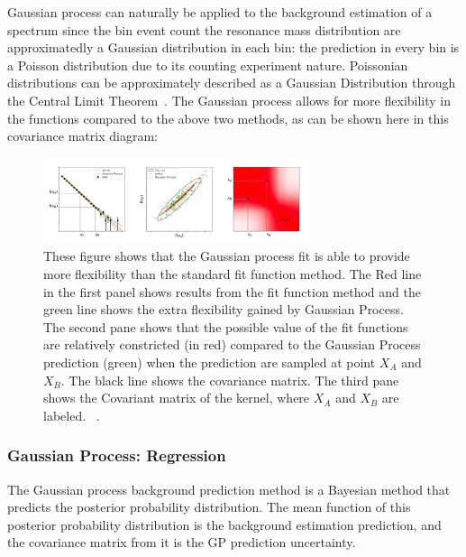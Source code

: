     Gaussian process can naturally be applied to the background estimation of a spectrum since the bin event count the resonance mass distribution are approximatedly a Gaussian distribution in each bin: the prediction in every bin is a Poisson distribution due to its counting experiment nature. Poissonian distributions can be approximately described as a Gaussian Distribution through the Central Limit Theorem~\cite{kwak2017central}. The Gaussian process allows for more flexibility in the functions compared to the above two methods, as can be shown here in this covariance matrix diagram:

    \begin{figure}[!htb]
        \begin{center}
            \includegraphics[width=0.7\textwidth]{figures/chapter_analysismethod/GP}
            \caption{
                These figure shows that the Gaussian process fit is able to provide more flexibility than the standard fit function method. The Red line in the first panel shows results from the fit function method and the green line shows the extra flexibility gained by Gaussian Process. The second pane shows that the possible value of the fit functions are relatively constricted (in red) compared to the Gaussian Process prediction (green) when the prediction are sampled at point $X_{A}$ and $X_{B}$. The black line shows the covariance matrix. The third pane shows the Covariant matrix of the kernel, where $X_{A}$ and $X_{B}$ are labeled. ~\cite{frate2017modeling}.
            }
            \label{fig:GaussianProcess}
        \end{center}
    \end{figure}
    \FloatBarrier


\subsubsection{Gaussian Process: Regression}

The Gaussian process background prediction method is a Bayesian method that predicts the posterior probability distribution. The mean function of this posterior probability distribution is the background estimation prediction, and the covariance matrix from it is the GP prediction uncertainty.

